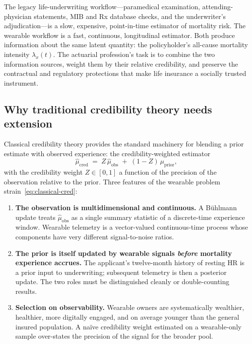\documentclass[11pt,a4paper]{article}
\theoremstyle{ia}
\newcommand{\1}{\mathbf{1}}
\begin{document}
The legacy life-underwriting workflow---paramedical examination,
attending-physician statements, MIB and Rx database checks, and the
underwriter's adjudication---is a slow, expensive, point-in-time
estimator of mortality risk. The wearable workflow is a fast,
continuous, longitudinal estimator. Both produce information about the
same latent quantity: the policyholder's all-cause mortality intensity
$\lambda_x(t)$. The actuarial profession's task is to combine the two
information sources, weight them by their relative credibility, and
preserve the contractual and regulatory protections that make life
insurance a socially trusted instrument.

\subsection{Why traditional credibility theory needs extension}\label{ss:why-credibility}

Classical credibility theory \citep{Buhlmann1967,BuhlmannGisler2005}
provides the standard machinery for blending a prior estimate with
observed experience: the credibility-weighted estimator
\begin{equation}\label{eq:classical-cred}
   \hat\mu_{\mathrm{cred}} \;=\; Z\,\hat\mu_{\mathrm{obs}}
   \;+\; (1-Z)\,\mu_{\mathrm{prior}},
\end{equation}
with the credibility weight $Z\in[0,1]$ a function of the precision of
the observation relative to the prior. Three features of the wearable
problem strain~\eqref{eq:classical-cred}:

\begin{enumerate}[leftmargin=*,nosep,topsep=4pt]
   \item \textbf{The observation is multidimensional and continuous.}
         A B\"uhlmann update treats $\hat\mu_{\mathrm{obs}}$ as a single
         summary statistic of a discrete-time experience window.
         Wearable telemetry is a vector-valued continuous-time process
         whose components have very different signal-to-noise ratios.
   \item \textbf{The prior is itself updated by wearable signals
         \emph{before} mortality experience accrues.} The applicant's
         twelve-month history of resting HR is a prior input to
         underwriting; subsequent telemetry is then a posterior update.
         The two roles must be distinguished cleanly or double-counting
         results.
   \item \textbf{Selection on observability.} Wearable owners are
         systematically wealthier, healthier, more digitally engaged,
         and on average younger than the general insured population.
         A na\"ive credibility weight estimated on a wearable-only
         sample over-states the precision of the signal for the
         broader pool.
\end{enumerate}
\end{document}
